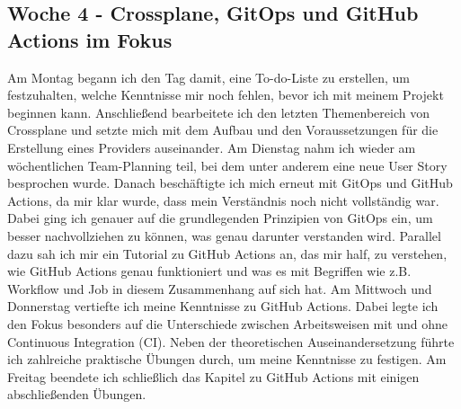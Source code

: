 \subsection{Woche 4 - Crossplane, GitOps und GitHub Actions im Fokus}
Am Montag begann ich den Tag damit, eine To-do-Liste zu erstellen, um festzuhalten,
welche Kenntnisse mir noch fehlen, bevor ich mit meinem Projekt beginnen kann.
Anschließend bearbeitete ich den letzten Themenbereich von Crossplane und setzte
mich mit dem Aufbau und den Voraussetzungen für die Erstellung eines Providers
auseinander.
Am Dienstag nahm ich wieder am wöchentlichen Team-Planning teil, bei dem unter
anderem eine neue User Story besprochen wurde. Danach beschäftigte ich mich
erneut mit GitOps und GitHub Actions, da mir klar wurde, dass mein Verständnis
noch nicht vollständig war. Dabei ging ich genauer auf die grundlegenden Prinzipien
von GitOps ein, um besser nachvollziehen zu können, was genau darunter
verstanden wird. Parallel dazu sah ich mir ein Tutorial zu GitHub Actions an, das mir
half, zu verstehen, wie GitHub Actions genau funktioniert und was es mit Begriffen
wie z.B. Workflow und Job in diesem Zusammenhang auf sich hat.
Am Mittwoch und Donnerstag vertiefte ich meine Kenntnisse zu GitHub Actions.
Dabei legte ich den Fokus besonders auf die Unterschiede zwischen Arbeitsweisen
mit und ohne Continuous Integration (CI). Neben der theoretischen
Auseinandersetzung führte ich zahlreiche praktische Übungen durch, um meine
Kenntnisse zu festigen.
Am Freitag beendete ich schließlich das Kapitel zu GitHub Actions mit einigen
abschließenden Übungen.

